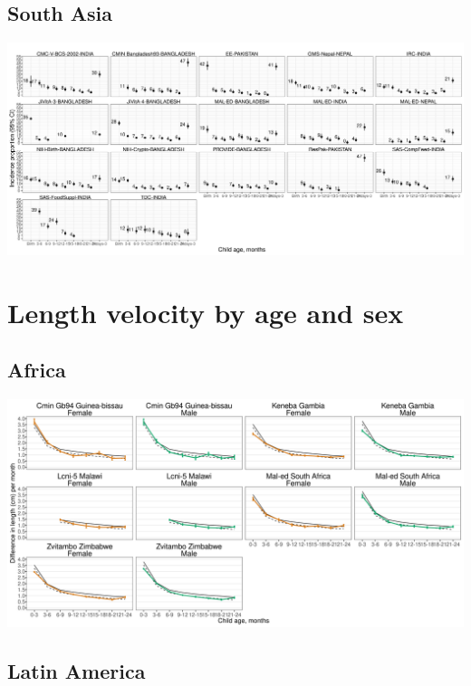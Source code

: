 \documentclass[
  9pt,
]{book}
\begin{document}
\hypertarget{south-asia-2}{%
\subsection{South Asia}\label{south-asia-2}}

\includegraphics[width=62.5in]{figures//stunting/fig-stunt-2-inc-cohort-asia-allage-primary}

\hypertarget{length-velocity-by-age-and-sex}{%
\section{Length velocity by age and sex}\label{length-velocity-by-age-and-sex}}

\hypertarget{africa-3}{%
\subsection{Africa}\label{africa-3}}

\includegraphics[width=50in]{figures//stunting/fig-stunt-2-vel-cohort-africa-allage-primary}

\hypertarget{latin-america-3}{%
\subsection{Latin America}\label{latin-america-3}}
\end{document}
